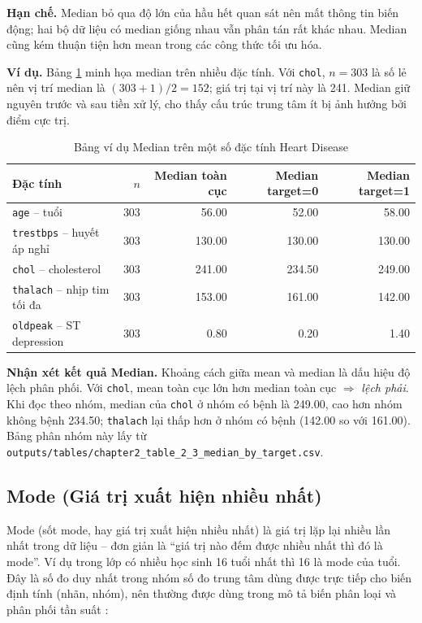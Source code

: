 \textbf{Hạn chế.} Median bỏ qua độ lớn của hầu hết quan sát nên mất thông tin biến động; hai bộ dữ liệu có median giống nhau vẫn phân tán rất khác nhau. Median cũng kém thuận tiện hơn mean trong các công thức tối ưu hóa.

\textbf{Ví dụ.} Bảng \ref{tab:chapter1_median_example} minh họa median trên nhiều đặc tính. Với \texttt{chol}, $n=303$ là số lẻ nên vị trí median là $(303+1)/2=152$; giá trị tại vị trí này là 241. Median giữ nguyên trước và sau tiền xử lý, cho thấy cấu trúc trung tâm ít bị ảnh hưởng bởi điểm cực trị.

\begin{table}[H]
\centering
\caption{Bảng ví dụ Median trên một số đặc tính Heart Disease}
\label{tab:chapter1_median_example}
\small
\begin{tabular}{lrrrr}
\toprule
Đặc tính & $n$ & Median toàn cục & Median target=0 & Median target=1 \\
\midrule
\texttt{age} -- tuổi & 303 & 56.00 & 52.00 & 58.00 \\
\texttt{trestbps} -- huyết áp nghỉ & 303 & 130.00 & 130.00 & 130.00 \\
\texttt{chol} -- cholesterol & 303 & 241.00 & 234.50 & 249.00 \\
\texttt{thalach} -- nhịp tim tối đa & 303 & 153.00 & 161.00 & 142.00 \\
\texttt{oldpeak} -- ST depression & 303 & 0.80 & 0.20 & 1.40 \\
\bottomrule
\end{tabular}
\end{table}

\textbf{Nhận xét kết quả Median.} Khoảng cách giữa mean và median là dấu hiệu độ lệch phân phối. Với \texttt{chol}, mean toàn cục lớn hơn median toàn cục $\Rightarrow$ \textit{lệch phải}. Khi đọc theo nhóm, median của \texttt{chol} ở nhóm có bệnh là 249.00, cao hơn nhóm không bệnh 234.50; \texttt{thalach} lại thấp hơn ở nhóm có bệnh (142.00 so với 161.00). Bảng phân nhóm này lấy từ \texttt{outputs/tables/chapter2\_table\_2\_3\_median\_by\_target.csv}.

\subsection{Mode (Giá trị xuất hiện nhiều nhất)}

Mode (sốt mode, hay giá trị xuất hiện nhiều nhất) là giá trị lặp lại nhiều lần nhất trong dữ liệu -- đơn giản là ``giá trị nào đếm được nhiều nhất thì đó là mode''. Ví dụ trong lớp có nhiều học sinh 16 tuổi nhất thì 16 là mode của tuổi. Đây là số đo duy nhất trong nhóm số đo trung tâm dùng được trực tiếp cho biến định tính (nhãn, nhóm), nên thường được dùng trong mô tả biến phân loại và phân phối tần suất \cite{Sahay2021Essentials,DeMauro2021DataAnalytics}:

